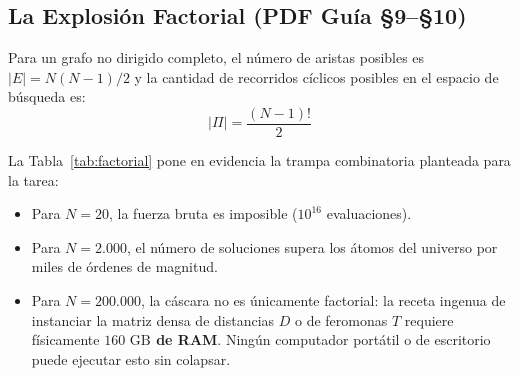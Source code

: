 \documentclass[11pt,a4paper]{article}
\begin{document}
\subsection{La Explosión Factorial (PDF Guía §9--§10)}
Para un grafo no dirigido completo, el número de aristas posibles es $|E| = N(N-1)/2$ y la cantidad de recorridos cíclicos posibles en el espacio de búsqueda es:
\begin{equation}
    |\Pi| = \frac{(N-1)!}{2}
\end{equation}

\begin{table}[H]
\centering
\caption{Escalamiento combinatorio del espacio factorial y demanda de almacenamiento.}
\label{tab:factorial}
\end{table}

La Tabla~\ref{tab:factorial} pone en evidencia la trampa combinatoria planteada para la tarea:
\begin{itemize}
    \item Para $N = 20$, la fuerza bruta es imposible ($10^{16}$ evaluaciones).
    \item Para $N = 2.000$, el número de soluciones supera los átomos del universo por miles de órdenes de magnitud.
    \item Para $N = 200.000$, la cáscara no es únicamente factorial: la receta ingenua de instanciar la matriz densa de distancias $D$ o de feromonas $T$ requiere físicamente \textbf{$160\text{ GB}$ de RAM}. Ningún computador portátil o de escritorio puede ejecutar esto sin colapsar.
\end{itemize}
\end{document}
